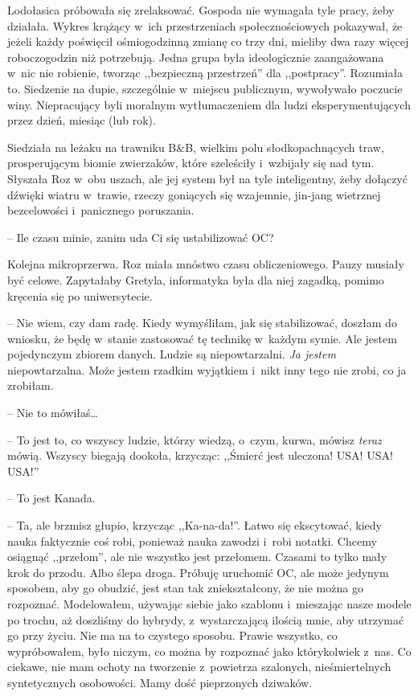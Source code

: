\documentclass[oneside,polish,11pt,sfheadings]{mwbk}
\begin{document}
Lodołasica próbowała się zrelaksować. Gospoda nie wymagała tyle pracy,
żeby działała. Wykres krążący w~ich przestrzeniach społecznościowych
pokazywał, że jeżeli każdy poświęcił ośmiogodzinną zmianę co trzy dni,
mieliby dwa razy więcej roboczogodzin niż potrzebują. Jedna grupa była
ideologicznie zaangażowana w~nic nie robienie, tworząc ,,bezpieczną
przestrzeń'' dla ,,postpracy''. Rozumiała to. Siedzenie na dupie,
szczególnie w~miejscu publicznym, wywoływało poczucie winy. Niepracujący
byli moralnym wytłumaczeniem dla ludzi eksperymentujących przez dzień,
miesiąc (lub rok).

Siedziała na leżaku na trawniku B\&B, wielkim polu słodkopachnących
traw, prosperującym biomie zwierzaków, które szeleściły i~wzbijały się
nad tym. Słyszała Roz w~obu uszach, ale jej system był na tyle
inteligentny, żeby dołączyć dźwięki wiatru w~trawie, rzeczy goniących
się wzajemnie, jin-jang wietrznej bezcelowości i~panicznego poruszania.

-- Ile czasu minie, zanim uda Ci się ustabilizować OC?

Kolejna mikroprzerwa. Roz miała mnóstwo czasu obliczeniowego. Pauzy
musiały być celowe. Zapytałaby Gretyla, informatyka była dla niej
zagadką, pomimo kręcenia się po uniwersytecie.

-- Nie wiem, czy dam radę. Kiedy wymyśliłam, jak się stabilizować,
doszłam do wniosku, że będę w~stanie zastosować tę technikę w~każdym
symie. Ale jestem pojedynczym zbiorem danych. Ludzie są niepowtarzalni.
\textit{Ja jestem} niepowtarzalna. Może jestem rzadkim wyjątkiem i~nikt
inny tego nie zrobi, co ja zrobiłam.

-- Nie to mówiłaś\ldots 

-- To jest to, co wszyscy ludzie, którzy wiedzą, o~czym, kurwa, mówisz
\textit{teraz }mówią. Wszyscy biegają dookoła, krzycząc: ,,Śmierć jest
uleczona! USA! USA! USA!''

-- To jest Kanada.

-- Ta, ale brzmisz głupio, krzycząc ,,Ka-na-da!''. Łatwo się ekscytować,
kiedy nauka faktycznie coś robi, ponieważ nauka zawodzi i~robi notatki.
Chcemy osiągnąć ,,przełom'', ale nie wszystko jest przełomem. Czasami to
tylko mały krok do przodu. Albo ślepa droga. Próbuję uruchomić OC, ale
może jedynym sposobem, aby go obudzić, jest stan tak zniekształcony, że
nie można go rozpoznać. Modelowałem, używając siebie jako szablonu i~mieszając nasze modele po trochu, aż doszliśmy do hybrydy, z~wystarczającą ilością mnie, aby utrzymać go przy życiu. Nie ma na to
czystego sposobu. Prawie wszystko, co wypróbowałem, było niczym, co
można by rozpoznać jako którykolwiek z~nas. Co ciekawe, nie mam ochoty
na tworzenie z~powietrza szalonych, nieśmiertelnych syntetycznych
osobowości. Mamy dość pieprzonych dziwaków.
\end{document}
